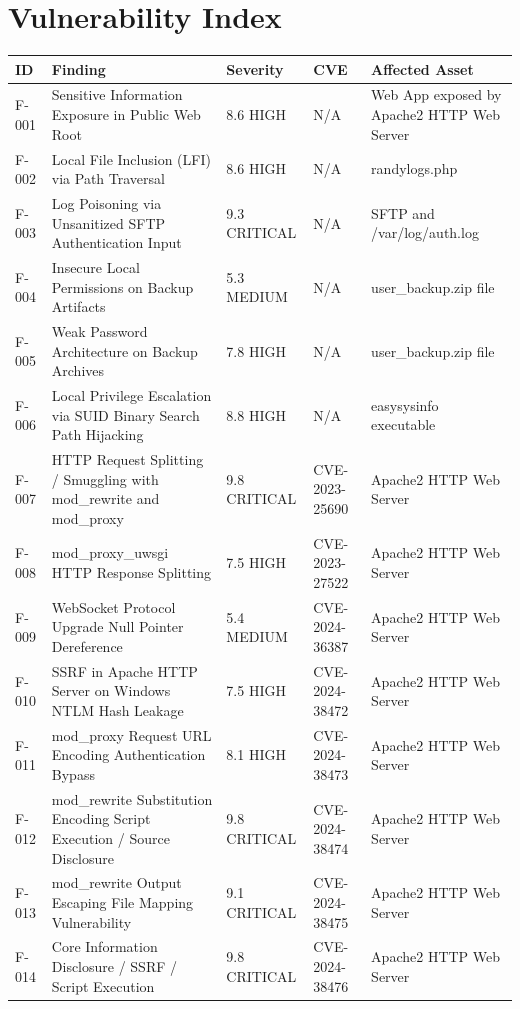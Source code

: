 \section{Vulnerability Index}

\begin{longtable}{|l|p{5cm}|l|l|p{3cm}|}
\hline
\textbf{ID} & \textbf{Finding} & \textbf{Severity} & \textbf{CVE} & \textbf{Affected Asset} \\ \hline
F-001 & Sensitive Information Exposure in Public Web Root & 8.6 HIGH & N/A & Web App exposed by Apache2 HTTP Web Server \\ \hline
F-002 & Local File Inclusion (LFI) via Path Traversal & 8.6 HIGH & N/A & randylogs.php \\ \hline
F-003 & Log Poisoning via Unsanitized SFTP Authentication Input & 9.3 CRITICAL & N/A & SFTP and /var/log/auth.log \\ \hline
F-004 & Insecure Local Permissions on Backup Artifacts & 5.3 MEDIUM & N/A & user\_backup.zip file \\ \hline
F-005 & Weak Password Architecture on Backup Archives & 7.8 HIGH & N/A & user\_backup.zip file \\ \hline
F-006 & Local Privilege Escalation via SUID Binary Search Path Hijacking & 8.8 HIGH & N/A & easysysinfo executable \\ \hline
F-007 & HTTP Request Splitting / Smuggling with mod\_rewrite and mod\_proxy & 9.8 CRITICAL & CVE-2023-25690 & Apache2 HTTP Web Server \\ \hline
F-008 & mod\_proxy\_uwsgi HTTP Response Splitting & 7.5 HIGH & CVE-2023-27522 & Apache2 HTTP Web Server \\ \hline
F-009 & WebSocket Protocol Upgrade Null Pointer Dereference & 5.4 MEDIUM & CVE-2024-36387 & Apache2 HTTP Web Server \\ \hline
F-010 & SSRF in Apache HTTP Server on Windows NTLM Hash Leakage & 7.5 HIGH & CVE-2024-38472 & Apache2 HTTP Web Server\\ \hline
F-011 & mod\_proxy Request URL Encoding Authentication Bypass & 8.1 HIGH & CVE-2024-38473 & Apache2 HTTP Web Server\\ \hline
F-012 & mod\_rewrite Substitution Encoding Script Execution / Source Disclosure & 9.8 CRITICAL & CVE-2024-38474 & Apache2 HTTP Web Server\\ \hline
F-013 & mod\_rewrite Output Escaping File Mapping Vulnerability & 9.1 CRITICAL & CVE-2024-38475 & Apache2 HTTP Web Server\\ \hline
F-014 & Core Information Disclosure / SSRF / Script Execution & 9.8 CRITICAL & CVE-2024-38476 & Apache2 HTTP Web Server\\ \hline

\end{longtable}
